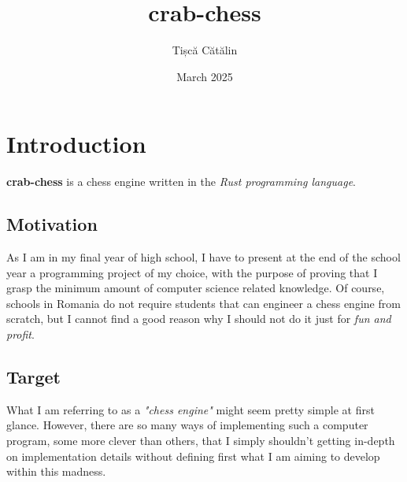 \documentclass{article}
\title{crab-chess}
\author{Tișcă Cătălin}
\date{March 2025}
\begin{document}
\maketitle

\section{Introduction}

\textbf{crab-chess} is a chess engine written in the \textit{Rust programming language}.

\subsection{Motivation}
As I am in my final year of high school, I have to present at the end of the school year a programming project of my choice, with the purpose of proving that I grasp the minimum amount of computer science related knowledge. Of course, schools in Romania do not require students that can engineer a chess engine from scratch, but I cannot find a good reason why I should not do it just for \textit{fun and profit}.

\subsection{Target}
What I am referring to as a \textit{"chess engine"} might seem pretty simple at first glance. However, there are so many ways of implementing such a computer program, some more clever than others, that I simply shouldn't getting in-depth on implementation details without defining first what I am aiming to develop within this madness. 
\end{document}
